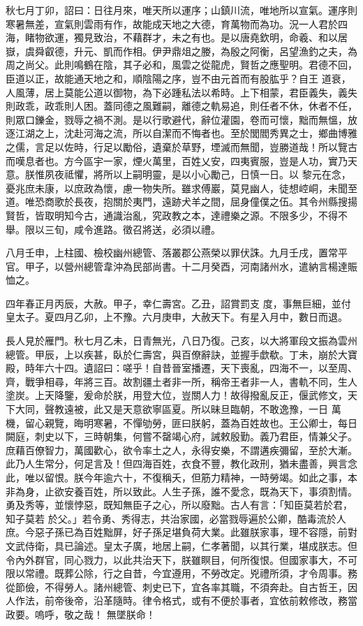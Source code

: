 \begin{pinyinscope}
 秋七月丁卯，詔曰：日往月來，唯天所以運序；山鎮川流，唯地所以宣氣。運序則寒暑無差，宣氣則雲雨有作，故能成天地之大德，育萬物而為功。況一人君於四海，睹物欲運，獨見致治，不藉群才，未之有也。是以唐堯欽明，命羲、和以居嶽，虞舜叡德，升元、凱而作相。伊尹鼎俎之媵，為殷之阿衡，呂望漁釣之夫，為周之尚父。此則鳴鶴在陰，其子必和，風雲之從龍虎，賢哲之應聖明。君德不回，臣道以正，故能通天地之和，順陰陽之序，豈不由元首而有股肱乎？自王
 道衰，人風薄，居上莫能公道以御物，為下必踵私法以希時。上下相蒙，君臣義失，義失則政乖，政乖則人困。蓋同德之風難嗣，離德之軌易追，則任者不休，休者不任，則眾口鑠金，戮辱之禍不測。是以行歌避代，辭位灌園，卷而可懷，黜而無慍，放逐江湖之上，沈赴河海之流，所以自潔而不悔者也。至於閭閻秀異之士，鄉曲博雅之儒，言足以佐時，行足以勵俗，遺棄於草野，堙滅而無聞，豈勝道哉！所以覽古而嘆息者也。方今區宇一家，煙火萬里，百姓乂安，四夷賓服，豈是人功，實乃天意。朕惟夙夜祗懼，將所以上嗣明靈，是以小心勵己，日慎一日。以
 黎元在念，憂兆庶未康，以庶政為懷，慮一物失所。雖求傅巖，莫見幽人，徒想崆峒，未聞至道。唯恐商歌於長夜，抱關於夷門，遠跡犬羊之間，屈身僮僕之伍。其令州縣搜揚賢哲，皆取明知今古，通識治亂，究政教之本，達禮樂之源。不限多少，不得不舉。限以三旬，咸令進路。徵召將送，必須以禮。



 八月壬申，上柱國、檢校幽州總管、落叢郡公燕榮以罪伏誅。九月壬戌，置常平官。甲子，以營州總管韋沖為民部尚書。十二月癸酉，河南諸州水，遣納言楊達賑恤之。



 四年春正月丙辰，大赦。甲子，幸仁壽宮。乙丑，詔賞罰支
 度，事無巨細，並付皇太子。夏四月乙卯，上不豫。六月庚申，大赦天下。有星入月中，數日而退。



 長人見於雁門。秋七月乙未，日青無光，八日乃復。己亥，以大將軍段文振為雲州總管。甲辰，上以疾甚，臥於仁壽宮，與百僚辭訣，並握手歔欷。丁未，崩於大寶殿，時年六十四。遺詔曰：嗟乎！自昔晉室播遷，天下喪亂，四海不一，以至周、齊，戰爭相尋，年將三百。故割疆土者非一所，稱帝王者非一人，書軌不同，生人塗炭。上天降鑒，爰命於朕，用登大位，豈關人力！故得撥亂反正，偃武修文，天下大同，聲教遠被，此又是天意欲寧區夏。所以昧旦臨朝，不敢逸豫，一日
 萬機，留心親覽，晦明寒暑，不憚劬勞，匪曰朕躬，蓋為百姓故也。王公卿士，每日闕庭，刺史以下，三時朝集，何嘗不罄竭心府，誡敕殷勤。義乃君臣，情兼父子。庶藉百僚智力，萬國歡心，欲令率土之人，永得安樂，不謂遘疾彌留，至於大漸。此乃人生常分，何足言及！但四海百姓，衣食不豐，教化政刑，猶未盡善，興言念此，唯以留恨。朕今年逾六十，不復稱夭，但筋力精神，一時勞竭。如此之事，本非為身，止欲安養百姓，所以致此。人生子孫，誰不愛念，既為天下，事須割情。勇及秀等，並懷悖惡，既知無臣子之心，所以廢黜。古人有言：「知臣莫若於君，知子莫若
 於父。」若令勇、秀得志，共治家國，必當戮辱遍於公卿，酷毒流於人庶。今惡子孫已為百姓黜屏，好子孫足堪負荷大業。此雖朕家事，理不容隱，前對文武侍衛，具已論述。皇太子廣，地居上嗣，仁孝著聞，以其行業，堪成朕志。但令內外群官，同心戮力，以此共治天下，朕雖瞑目，何所復恨。但國家事大，不可限以常禮。既葬公除，行之自昔，今宜遵用，不勞改定。兇禮所須，才令周事。務從節儉，不得勞人。諸州總管、刺史已下，宜各率其職，不須奔赴。自古哲王，因人作法，前帝後帝，沿革隨時。律令格式，或有不便於事者，宜依前敕修改，務當政要。嗚呼，敬之哉！
 無墜朕命！




\end{pinyinscope}
